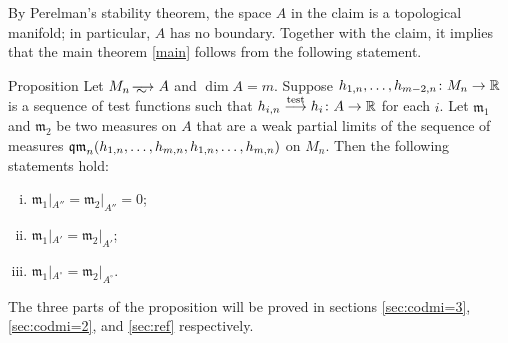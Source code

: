 By Perelman's stability theorem, the space $A$ in the claim is a topological manifold;
in particular, $A$ has no boundary.
Together with the claim, it implies that the main theorem \ref{main} follows from the following statement.

\begin{thm}{Proposition}\label{prop:3parts}
Let $M_n\smooths{} A$ and $\dim A=m$.
Suppose $h_{1,n},\dots, h_{m-2,n}\colon M_n\to\mathbb{R}$ is a sequence of test functions
such that $h_{i,n}\zz\testto  h_i\:A\to \RR$ for each $i$.
Let $\mathfrak m_1$ and $\mathfrak m_2$ be two measures on $A$ that are a weak partial limits of the sequence of measures $\qm_n( h_{1,n},\zz\dots,  h_{m,n}, h_{1,n},\zz\dots,  h_{m,n})$ on $M_n$.
Then the following statements hold:
\begin{enumerate}[(i)]
\item\label{prop:3parts:codim3} $\mathfrak m_1|_{A''}=\mathfrak m_2|_{A''}=0$;

\item\label{prop:3parts:codim2} $\mathfrak m_1|_{A'}=\mathfrak m_2|_{A'}$;

\item\label{prop:3parts:reg} $\mathfrak m_1|_{A^\circ}=\mathfrak m_2|_{A^\circ}$.
\end{enumerate}
\end{thm}

The three parts of the proposition will be proved in sections \ref{sec:codmi=3}, \ref{sec:codmi=2}, and \ref{sec:ref} respectively.
